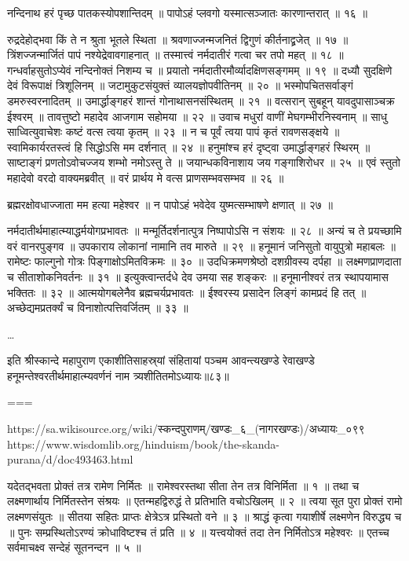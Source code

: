 नन्दिनाथ हरं पृच्छ पातकस्योपशान्तिदम् ॥
पापोऽहं प्लवगो यस्मात्सञ्जातः कारणान्तरात् ॥ १६ ॥

रुद्रदेहोद्भवा किं ते न श्रुता भूतले स्थिता ॥
श्रवणाज्जन्मजनितं द्विगुणं कीर्तनाद्व्रजेत् ॥ १७ ॥
त्रिंशज्जन्मार्जितं पापं नश्येद्रेवावगाहनात् ॥
तस्मात्त्वं नर्मदातीरं गत्वा चर तपो महत् ॥ १८ ॥
गन्धर्वाहसुतोऽप्येवं नन्दिनोक्तं निशम्य च ॥
प्रयातो नर्मदातीरमौर्व्यादक्षिणसङ्गमम् ॥ १९ ॥
दध्यौ सुदक्षिणे देवं विरूपाक्षं त्रिशूलिनम् ॥
जटामुकुटसंयुक्तं व्यालयज्ञोपवीतिनम् ॥ २० ॥
भस्मोपचितसर्वाङ्गं डमरुस्वरनादितम् ॥
उमार्द्धाङ्गहरं शान्तं गोनाथासनसंस्थितम् ॥ २१ ॥
वत्सरान् सुबहून् यावदुपासाञ्चक्र ईश्वरम् ॥
तावत्तुष्टो महादेव आजगाम सहोमया ॥ २२ ॥
उवाच मधुरां वाणीं मेघगम्भीरनिस्वनाम् ॥
साधु साध्वित्युवाचेशः कष्टं वत्स त्वया कृतम् ॥ २३ ॥
न च पूर्वं त्वया पापं कृतं रावणसङ्क्षये ॥
स्वामिकार्यरतस्त्वं हि सिद्धोऽसि मम दर्शनात् ॥ २४ ॥
हनुमांश्च हरं दृष्ट्वा उमार्द्धाङ्गहरं स्थिरम् ॥
साष्टाङ्गं प्रणतोऽवोचज्जय शम्भो नमोऽस्तु ते ॥
जयान्धकविनाशाय जय गङ्गाशिरोधर ॥ २५ ॥
एवं स्तुतो महादेवो वरदो वाक्यमब्रवीत् ॥
वरं प्रार्थय मे वत्स प्राणसम्भवसम्भव ॥ २६ ॥

ब्रह्मरक्षोवधाज्जाता मम हत्या महेश्वर ॥
न पापोऽहं भवेदेव युष्मत्सम्भाषणे क्षणात् ॥ २७ ॥

नर्मदातीर्थमाहात्म्याद्धर्मयोगप्रभावतः ॥
मन्मूर्तिदर्शनात्पुत्र निष्पापोऽसि न संशयः ॥ २८ ॥
अन्यं च ते प्रयच्छामि वरं वानरपुङ्गव ॥
उपकाराय लोकानां नामानि तव मारुते ॥ २९ ॥
हनूमानं जनिसुतो वायुपुत्रो महाबलः ॥
रामेष्टः फाल्गुनो गोत्रः पिङ्गाक्षोऽमितविक्रमः ॥ ३० ॥
उदधिक्रमणश्रेष्ठो दशग्रीवस्य दर्पहा ॥
लक्ष्मणप्राणदाता च सीताशोकनिवर्तनः ॥ ३१ ॥
इत्युक्त्वान्तर्दधे देव उमया सह शङ्करः ॥
हनूमानीश्वरं तत्र स्थापयामास भक्तितः ॥ ३२ ॥
आत्मयोगबलेनैव ब्रह्मचर्यप्रभावतः ॥
ईश्वरस्य प्रसादेन लिङ्गं कामप्रदं हि तत् ॥
अच्छेद्यमप्रतर्क्यं च विनाशोत्पत्तिवर्जितम् ॥ ३३ ॥

\ldots

इति श्रीस्कान्दे महापुराण एकाशीतिसाहस्र्यां संहितायां पञ्चम आवन्त्यखण्डे रेवाखण्डे हनूमन्तेश्वरतीर्थमाहात्म्यवर्णनं नाम त्र्यशीतितमोऽध्यायः॥८३॥


===

https://sa.wikisource.org/wiki/स्कन्दपुराणम्/खण्डः_६_(नागरखण्डः)/अध्यायः_०९९
https://www.wisdomlib.org/hinduism/book/the-skanda-purana/d/doc493463.html


यदेतद्भवता प्रोक्तं तत्र रामेण निर्मितः ॥
रामेश्वरस्तथा सीता तेन तत्र विनिर्मिता ॥ १ ॥
तथा च लक्ष्मणार्थाय निर्मितस्तेन संश्रयः ॥
एतन्महद्विरुद्धं ते प्रतिभाति वचोऽखिलम् ॥ २ ॥
त्वया सूत पुरा प्रोक्तं रामो लक्ष्मणसंयुतः ॥
सीतया सहितः प्राप्तः क्षेत्रेऽत्र प्रस्थितो वने ॥ ३ ॥
श्राद्धं कृत्वा गयाशीर्षे लक्ष्मणेन विरुद्ध्य च ॥
पुनः सम्प्रस्थितोऽरण्यं क्रोधाविष्टश्च तं प्रति ॥ ४ ॥
यत्त्वयोक्तं तदा तेन निर्मितोऽत्र महेश्वरः ॥
एतच्च सर्वमाचक्ष्व सन्देहं सूतनन्दन ॥ ५ ॥

